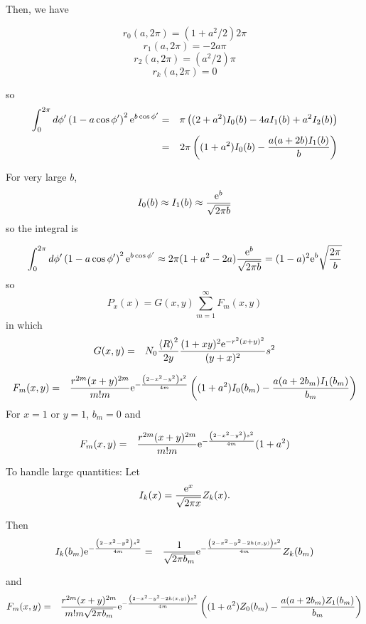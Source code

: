 \documentclass[11pt,openany]{report}
\newcommand{\e}{{\rm e}}
\begin{document}
{{Then, we have

$$r_{0}(a,2\pi)=(1+a^{2}/2)2\pi$$
$$r_{1}(a,2\pi)=-2a\pi$$
$$r_{2}(a,2\pi)=(a^{2}/2)\pi$$
$$r_{k}(a,2\pi)=0$$

so
\begin{eqnarray}
\int_{0}^{2\pi}d\phi'\left(1-a\cos\phi' \right)^{2}\e^{b\cos\phi'}&=&
\pi\left((2+a^{2})I_{0}(b)-4aI_{1}(b)+a^{2}I_{2}(b)\right)\\
&=&
2\pi\left((1+a^{2})I_{0}(b)-\frac{a(a+2b)I_{1}(b)}{b}\right)
\end{eqnarray}

For very large $b$,
$$I_{0}(b)\approx I_{1}(b)\approx\frac{\e^{b}}{\sqrt{2\pi b}}$$ so the integral is

$$\int_{0}^{2\pi}d\phi'\left(1-a\cos\phi' \right)^{2}\e^{b\cos\phi'}\approx 2\pi(1+a^{2}-2a)\frac{\e^{b}}{\sqrt{2\pi b}}=(1-a)^{2}\e^{b}\sqrt{\frac{2\pi}{ b}}$$
so
$$P_{x}(x)=G(x,y)\sum_{m=1}^{\infty}F_{m}(x,y)$$
in which
\begin{eqnarray}
G(x,y)&=&N_{0}\frac{\left<R\right>^{2}}{2y}\frac{(1+xy)^{2}\e^{-r^{2}(x+y)^{2}}}{(y+x)^{2}}
s^{2}
\end{eqnarray}

\begin{eqnarray}
F_{m}(x,y)&=&\frac{r^{2m}(x+y)^{2m}}{m!m}\e^{-\frac{\left(2-x^{2}-y^{2}\right)s^{2}}{4m}}\left((1+a^{2})I_{0}(b_{m})-\frac{a(a+2b_{m})I_{1}(b_{m})}{b_{m}}\right)
\end{eqnarray}
For $x=1$ or $y=1$, $b_{m}=0$ and

\begin{eqnarray}
F_{m}(x,y)&=&\frac{r^{2m}(x+y)^{2m}}{m!m}\e^{-\frac{\left(2-x^{2}-y^{2}\right)s^{2}}{4m}}(1+a^{2})
\end{eqnarray}


To handle large quantities:
Let $$I_{k}(x)=\frac{\e^{x}}{\sqrt{2\pi x}}Z_{k}(x).$$

Then
\begin{eqnarray}
I_{k}(b_{m})\e^{-\frac{\left(2-x^{2}-y^{2}\right)s^{2}}{4m}}&=&\frac{1}{\sqrt{2\pi b_{m}}}\e^{-\frac{\left(2-x^{2}-y^{2}-2h(x,y)\right)s^{2}}{4m}}Z_{k}(b_{m})
\end{eqnarray}

and
\begin{eqnarray}
F_{m}(x,y)&=&\frac{r^{2m}(x+y)^{2m}}{m!m\sqrt{2\pi b_{m}}}\e^{-\frac{\left(2-x^{2}-y^{2}-2h(x,y)\right)s^{2}}{4m}}\left((1+a^{2})Z_{0}(b_{m})-\frac{a(a+2b_{m})Z_{1}(b_{m})}{b_{m}}\right)
\end{eqnarray}

}}
\end{document}
